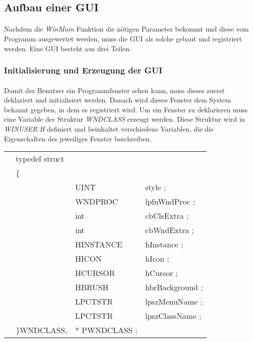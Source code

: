 \subsection{Aufbau einer GUI}
\paragraph{}
Nachdem die \textit{WinMain} Funktion die nötigen Parameter bekommt und diese vom Programm ausgewertet werden, muss die GUI als solche gebaut und registriert werden. Eine GUI besteht aus drei Teilen.


\subsubsection{Initialisierung und Erzeugung der GUI}
\paragraph{}
Damit der Benutzer ein Programmfenster sehen kann, muss dieses zuerst deklariert und initialisiert werden. Danach wird dieses Fenster dem System bekannt gegeben, in dem es registriert wird. Um ein Fenster zu deklarieren muss eine Variable der Struktur \textit{WNDCLASS} erzeugt werden. Diese Struktur wird in \textit{WINUSER.H} definiert und beinhaltet verschiedene Variablen, die die Eigenschaften des jeweiliges Fenster beschreiben.



\begin{tabular}{llll}
& typedef struct\\
& \{\\
& & UINT        & style ;\\
& & WNDPROC     & lpfnWndProc ;\\
& & int         & cbClsExtra ;\\
& & int         & cbWndExtra ;\\
& & HINSTANCE   & hInstance ;\\
& & HICON       & hIcon ;\\
& & HCURSOR     & hCursor ;\\
& & HBRUSH      & hbrBackground ;\\
& & LPCTSTR     & lpszMenuName ;\\
& & LPCTSTR     & lpszClassName ;\\
&\}WNDCLASS,&* PWNDCLASS ;
\end{tabular}


